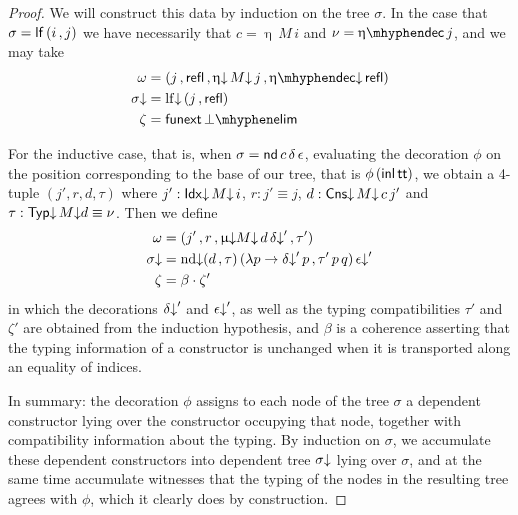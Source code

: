 \begin{proof}
  We will construct this data by induction on the tree $\sigma$.  In
  the case that $\sigma = \mathsf{lf}\, (i \,, j)$  we have necessarily that
  $c = \upeta\, M\, i$ and $\nu = \etadec j$, and we may take
  \begin{align*}
    \omega &= (j \,, \refl\, , \upetad\, M\da\, j \, , \etadecd \refl) \\
    \sigma\da &= \lfd\, (j \, , \refl) \\
    \zeta &= \mathsf{funext}\, \botelim
  \end{align*}

  For the inductive case, that is, when
  $\sigma = \mathsf{nd}\, c\, \delta\, \epsilon$, evaluating the decoration
  $\phi$ on the
  position corresponding to the base of our tree, that is
  $\phi\, (\mathsf{inl}\, \mathsf{tt})$, we obtain a 4-tuple $(j',r,d,\tau)$ where
  $j' : \mathsf{Idx}{\downarrow}\, M{\downarrow}\, i$, $r : j' \equiv j$, $d : \mathsf{Cns}{\downarrow}\, M{\downarrow}\, c\, j'$ and
  $\tau : \mathsf{Typ}{\downarrow}\, M{\downarrow} d \equiv \nu$.  Then we define
  \begin{align*}
    \omega &= (j' \,, r \,, \upmu{\downarrow} M{\downarrow}\, d\, \delta{\downarrow}' \,, \tau') \\
    \sigma{\downarrow} &= \operatorname{nd{\downarrow}} (d \,, \tau)\, (\lambda p \to \delta{\downarrow}' \, p \,, \tau'\, p \, q) \, \epsilon{\downarrow}' \\
    \zeta &= \beta \cdot \zeta'
  \end{align*}
  in which the decorations $\delta{\downarrow}'$ and $\epsilon{\downarrow}'$, as well as
  the typing compatibilities $\tau'$ and $\zeta'$ are obtained from
  the induction hypothesis, and $\beta$ is a coherence asserting that
  the typing information of a constructor is unchanged when it is
  transported along an equality of indices.

  In summary: the decoration $\phi$ assigns to each node of the tree
  $\sigma$ a dependent constructor lying over the constructor
  occupying that node, together with compatibility information about
  the typing.  By induction on $\sigma$, we accumulate these dependent
  constructors into dependent tree $\sigma{\downarrow}$ lying over $\sigma$,
  and at the same time accumulate witnesses that the typing of the
  nodes in the resulting tree agrees with $\phi$, which it clearly
  does by construction.
  

\end{proof}
